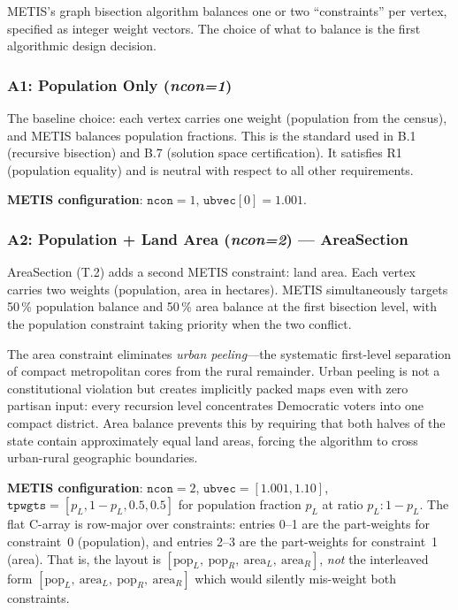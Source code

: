 METIS's graph bisection algorithm balances one or two ``constraints'' per vertex,
specified as integer weight vectors.
The choice of what to balance is the first algorithmic design decision.

\subsubsection*{A1: Population Only (\textit{ncon=1})}

The baseline choice: each vertex carries one weight (population from the census),
and METIS balances population fractions.
This is the standard used in B.1 (recursive bisection) and B.7 (solution space
certification).
It satisfies R1 (population equality) and is neutral with respect to all other
requirements.

\textbf{METIS configuration}: $\mathtt{ncon}=1$, $\mathtt{ubvec}[0]=1.001$.

\subsubsection*{A2: Population + Land Area (\textit{ncon=2}) --- AreaSection}

AreaSection (T.2) adds a second METIS constraint: land area.
Each vertex carries two weights (population, area in hectares).
METIS simultaneously targets 50\,\% population balance and 50\,\% area balance
at the first bisection level, with the population constraint taking priority
when the two conflict.

The area constraint eliminates \emph{urban peeling}---the systematic first-level
separation of compact metropolitan cores from the rural remainder.
Urban peeling is not a constitutional violation but creates implicitly packed
maps even with zero partisan input: every recursion level concentrates Democratic
voters into one compact district.
Area balance prevents this by requiring that both halves of the state contain
approximately equal land areas, forcing the algorithm to cross urban-rural
geographic boundaries.

\textbf{METIS configuration}: $\mathtt{ncon}=2$,
$\mathtt{ubvec}=[1.001, 1.10]$,
$\mathtt{tpwgts}=[p_L, 1-p_L, 0.5, 0.5]$ for population fraction $p_L$ at ratio $p_L:1-p_L$.
The flat C-array is row-major over constraints: entries 0--1 are the part-weights for
constraint~0 (population), and entries 2--3 are the part-weights for constraint~1 (area).
That is, the layout is $[\text{pop}_L,\ \text{pop}_R,\ \text{area}_L,\ \text{area}_R]$,
\emph{not} the interleaved form $[\text{pop}_L,\ \text{area}_L,\ \text{pop}_R,\ \text{area}_R]$
which would silently mis-weight both constraints.

